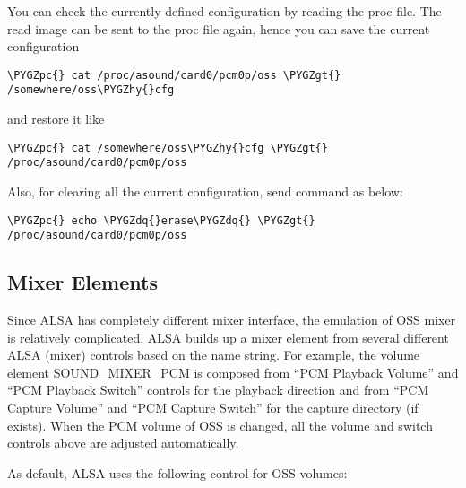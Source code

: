 \documentclass[a4paper,8pt,english]{sphinxmanual}
\def\PYGZgt{\char`\>}
\def\PYGZpc{\char`\%}
\def\PYGZhy{\char`\-}
\def\PYGZdq{\char`\"}
\begin{document}
You can check the currently defined configuration by reading the proc
file.  The read image can be sent to the proc file again, hence you
can save the current configuration

\begin{Verbatim}[commandchars=\\\{\}]
\PYGZpc{} cat /proc/asound/card0/pcm0p/oss \PYGZgt{} /somewhere/oss\PYGZhy{}cfg
\end{Verbatim}

and restore it like

\begin{Verbatim}[commandchars=\\\{\}]
\PYGZpc{} cat /somewhere/oss\PYGZhy{}cfg \PYGZgt{} /proc/asound/card0/pcm0p/oss
\end{Verbatim}

Also, for clearing all the current configuration, send  command
as below:

\begin{Verbatim}[commandchars=\\\{\}]
\PYGZpc{} echo \PYGZdq{}erase\PYGZdq{} \PYGZgt{} /proc/asound/card0/pcm0p/oss
\end{Verbatim}


\subsection{Mixer Elements}
\label{sound/designs/oss-emulation:mixer-elements}
Since ALSA has completely different mixer interface, the emulation of
OSS mixer is relatively complicated.  ALSA builds up a mixer element
from several different ALSA (mixer) controls based on the name
string.  For example, the volume element SOUND\_MIXER\_PCM is composed
from ``PCM Playback Volume'' and ``PCM Playback Switch'' controls for the
playback direction and from ``PCM Capture Volume'' and ``PCM Capture
Switch'' for the capture directory (if exists).  When the PCM volume of
OSS is changed, all the volume and switch controls above are adjusted
automatically.

As default, ALSA uses the following control for OSS volumes:
\end{document}
